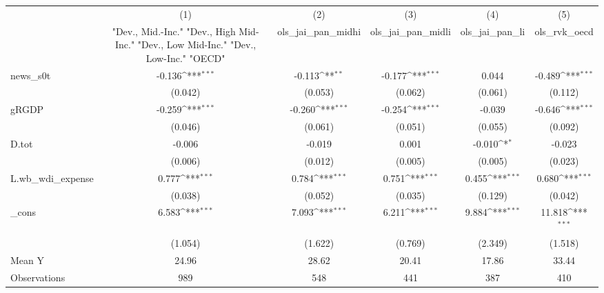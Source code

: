{
\def\sym#1{\ifmmode^{#1}\else\(^{#1}\)\fi}
\begin{tabular}{l*{5}{c}}
\toprule
            &\multicolumn{1}{c}{(1)}&\multicolumn{1}{c}{(2)}&\multicolumn{1}{c}{(3)}&\multicolumn{1}{c}{(4)}&\multicolumn{1}{c}{(5)}\\
            &\multicolumn{1}{c}{ "Dev., Mid.-Inc." "Dev., High Mid-Inc." "Dev., Low Mid-Inc." "Dev., Low-Inc." "OECD" }&\multicolumn{1}{c}{ols\_jai\_pan\_midhi}&\multicolumn{1}{c}{ols\_jai\_pan\_midli}&\multicolumn{1}{c}{ols\_jai\_pan\_li}&\multicolumn{1}{c}{ols\_rvk\_oecd}\\
\midrule
news\_s0t    &      -0.136\sym{***}&      -0.113\sym{**} &      -0.177\sym{***}&       0.044         &      -0.489\sym{***}\\
            &     (0.042)         &     (0.053)         &     (0.062)         &     (0.061)         &     (0.112)         \\
\addlinespace
gRGDP       &      -0.259\sym{***}&      -0.260\sym{***}&      -0.254\sym{***}&      -0.039         &      -0.646\sym{***}\\
            &     (0.046)         &     (0.061)         &     (0.051)         &     (0.055)         &     (0.092)         \\
\addlinespace
D.tot       &      -0.006         &      -0.019         &       0.001         &      -0.010\sym{*}  &      -0.023         \\
            &     (0.006)         &     (0.012)         &     (0.005)         &     (0.005)         &     (0.023)         \\
\addlinespace
L.wb\_wdi\_expense&       0.777\sym{***}&       0.784\sym{***}&       0.751\sym{***}&       0.455\sym{***}&       0.680\sym{***}\\
            &     (0.038)         &     (0.052)         &     (0.035)         &     (0.129)         &     (0.042)         \\
\addlinespace
\_cons      &       6.583\sym{***}&       7.093\sym{***}&       6.211\sym{***}&       9.884\sym{***}&      11.818\sym{***}\\
            &     (1.054)         &     (1.622)         &     (0.769)         &     (2.349)         &     (1.518)         \\
\midrule
Mean Y      &       24.96         &       28.62         &       20.41         &       17.86         &       33.44         \\
Observations&         989         &         548         &         441         &         387         &         410         \\
\bottomrule
\end{tabular}
}
